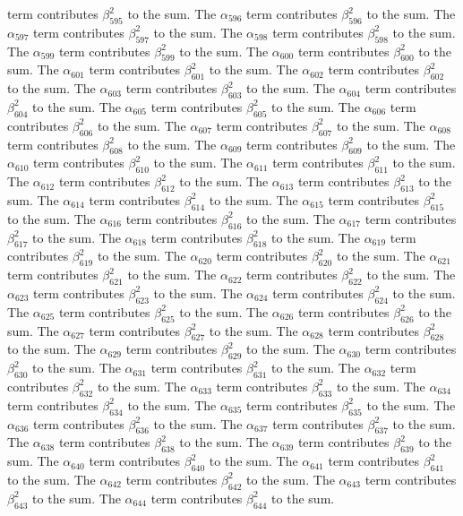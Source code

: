 \begin{lemma}
term contributes $\beta_{595}^{2}$ to the sum. The $\alpha_{596}$ term contributes $\beta_{596}^{2}$ to the sum. The $\alpha_{597}$ term contributes $\beta_{597}^{2}$ to the sum. The $\alpha_{598}$ term contributes $\beta_{598}^{2}$ to the sum. The $\alpha_{599}$ term contributes $\beta_{599}^{2}$ to the sum. The $\alpha_{600}$ term contributes $\beta_{600}^{2}$ to the sum. The $\alpha_{601}$ term contributes $\beta_{601}^{2}$ to the sum. The $\alpha_{602}$ term contributes $\beta_{602}^{2}$ to the sum. The $\alpha_{603}$ term contributes $\beta_{603}^{2}$ to the sum. The $\alpha_{604}$ term contributes $\beta_{604}^{2}$ to the sum. The $\alpha_{605}$ term contributes $\beta_{605}^{2}$ to the sum. The $\alpha_{606}$ term contributes $\beta_{606}^{2}$ to the sum. The $\alpha_{607}$ term contributes $\beta_{607}^{2}$ to the sum. The $\alpha_{608}$ term contributes $\beta_{608}^{2}$ to the sum. The $\alpha_{609}$ term contributes $\beta_{609}^{2}$ to the sum. The $\alpha_{610}$ term contributes $\beta_{610}^{2}$ to the sum. The $\alpha_{611}$ term contributes $\beta_{611}^{2}$ to the sum. The $\alpha_{612}$ term contributes $\beta_{612}^{2}$ to the sum. The $\alpha_{613}$ term contributes $\beta_{613}^{2}$ to the sum. The $\alpha_{614}$ term contributes $\beta_{614}^{2}$ to the sum. The $\alpha_{615}$ term contributes $\beta_{615}^{2}$ to the sum. The $\alpha_{616}$ term contributes $\beta_{616}^{2}$ to the sum. The $\alpha_{617}$ term contributes $\beta_{617}^{2}$ to the sum. The $\alpha_{618}$ term contributes $\beta_{618}^{2}$ to the sum. The $\alpha_{619}$ term contributes $\beta_{619}^{2}$ to the sum. The $\alpha_{620}$ term contributes $\beta_{620}^{2}$ to the sum. The $\alpha_{621}$ term contributes $\beta_{621}^{2}$ to the sum. The $\alpha_{622}$ term contributes $\beta_{622}^{2}$ to the sum. The $\alpha_{623}$ term contributes $\beta_{623}^{2}$ to the sum. The $\alpha_{624}$ term contributes $\beta_{624}^{2}$ to the sum. The $\alpha_{625}$ term contributes $\beta_{625}^{2}$ to the sum. The $\alpha_{626}$ term contributes $\beta_{626}^{2}$ to the sum. The $\alpha_{627}$ term contributes $\beta_{627}^{2}$ to the sum. The $\alpha_{628}$ term contributes $\beta_{628}^{2}$ to the sum. The $\alpha_{629}$ term contributes $\beta_{629}^{2}$ to the sum. The $\alpha_{630}$ term contributes $\beta_{630}^{2}$ to the sum. The $\alpha_{631}$ term contributes $\beta_{631}^{2}$ to the sum. The $\alpha_{632}$ term contributes $\beta_{632}^{2}$ to the sum. The $\alpha_{633}$ term contributes $\beta_{633}^{2}$ to the sum. The $\alpha_{634}$ term contributes $\beta_{634}^{2}$ to the sum. The $\alpha_{635}$ term contributes $\beta_{635}^{2}$ to the sum. The $\alpha_{636}$ term contributes $\beta_{636}^{2}$ to the sum. The $\alpha_{637}$ term contributes $\beta_{637}^{2}$ to the sum. The $\alpha_{638}$ term contributes $\beta_{638}^{2}$ to the sum. The $\alpha_{639}$ term contributes $\beta_{639}^{2}$ to the sum. The $\alpha_{640}$ term contributes $\beta_{640}^{2}$ to the sum. The $\alpha_{641}$ term contributes $\beta_{641}^{2}$ to the sum. The $\alpha_{642}$ term contributes $\beta_{642}^{2}$ to the sum. The $\alpha_{643}$ term contributes $\beta_{643}^{2}$ to the sum. The $\alpha_{644}$ term contributes $\beta_{644}^{2}$ to the sum. 
\end{lemma}
